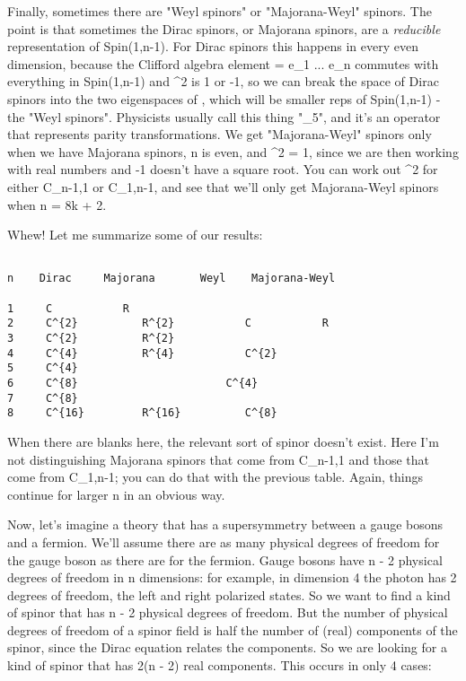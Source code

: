 Finally, sometimes there are "Weyl spinors" or
"Majorana-Weyl" spinors.  The point is that sometimes the
Dirac spinors, or Majorana spinors, are a \emph{reducible}
representation of Spin(1,n-1).  For Dirac spinors this happens in every
even dimension, because the Clifford algebra element 
 \Gamma  =
e_{1} ... e_{n} 
 commutes with everything in
Spin(1,n-1) and \Gamma ^{2} is 1 or -1, so we can break the space
of Dirac spinors into the two eigenspaces of \Gamma , which will be
smaller reps of Spin(1,n-1) - the "Weyl spinors".  Physicists
usually call this \Gamma  thing "\gamma _{5}", and it's an
operator that represents parity transformations.  We get
"Majorana-Weyl" spinors only when we have Majorana spinors, n
is even, and \Gamma ^{2} = 1, since we are then working with real
numbers and -1 doesn't have a square root.  You can work out
\Gamma ^{2} for either C_{n-1,1} or C_{1,n-1},
and see that we'll only get Majorana-Weyl spinors when n = 8k + 2.

Whew!  Let me summarize some of our results:


\begin{verbatim}

n    Dirac     Majorana       Weyl    Majorana-Weyl

1     C           R             
2     C^{2}          R^{2}           C           R
3     C^{2}          R^{2} 
4     C^{4}          R^{4}           C^{2}
5     C^{4}        
6     C^{8}                       C^{4}
7     C^{8}
8     C^{16}         R^{16}          C^{8}

\end{verbatim}
    
When there are blanks here, the relevant sort of spinor doesn't
exist.  Here I'm not distinguishing Majorana spinors that come from
C_{n-1,1} and those that come from C_{1,n-1}; you can do that with
the previous table.  Again, things continue for larger n in an obvious
way.  

Now, let's imagine a theory that has a supersymmetry between a gauge
bosons and a fermion.  We'll assume there are as many physical degrees of 
freedom for the gauge boson as there are for the fermion.   Gauge
bosons have n - 2 physical degrees of freedom in n dimensions: for
example, in dimension 4 the photon has 2 degrees of freedom, the left
and right polarized states.  So we want to find a kind of spinor that
has n - 2 physical degrees of freedom.  But the number of physical
degrees of freedom of a spinor field is half the number of (real) 
components of the spinor, since the Dirac equation relates the
components.  So we are looking for a kind of spinor that has 2(n - 2)
real components.  This occurs in only 4 cases:

